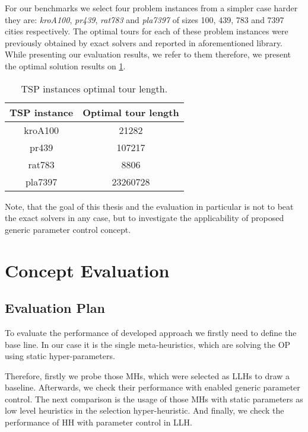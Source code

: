 For our benchmarks we select four problem instances from a simpler case harder they are: \emph{kroA100}, \emph{pr439}, \emph{rat783} and \emph{pla7397} of sizes 100, 439, 783 and 7397 cities respectively. The optimal tours for each of these problem instances were previously obtained by exact solvers and reported in aforementioned library. While presenting our evaluation results, we refer to them therefore, we present the optimal solution results on \cref{eval:table:tsp optimal tour length}.

\begin{table}[h!]
	\centering
	\begin{tabular}{c||c}
		\textbf{TSP instance} & \textbf{Optimal tour length} \\
		\hline
		\hline
		kroA100 & 21282 \\
		pr439 & 107217 \\
		rat783 & 8806 \\
		pla7397 & 23260728 \\
	\end{tabular}
	\caption{TSP instances optimal tour length.}
	\label{eval:table:tsp optimal tour length}
\end{table}

Note, that the goal of this thesis and the evaluation in particular is not to beat the exact solvers in any case, but to investigate the applicability of proposed generic parameter control concept.


\section{Concept Evaluation}\label{eval: concept}

\subsection{Evaluation Plan}\label{eval: concept plan}
To evaluate the performance of developed approach we firstly need to define the base line. In our case it is the single meta-heuristics, which are solving the OP using static hyper-parameters. 

Therefore, firstly we probe those MHs, which were selected as LLHs to draw a baseline. Afterwards, we check their performance with enabled generic parameter control. The next comparison is the usage of those MHs with static parameters as low level heuristics in the selection hyper-heuristic. And finally, we check the performance of HH with parameter control in LLH.

